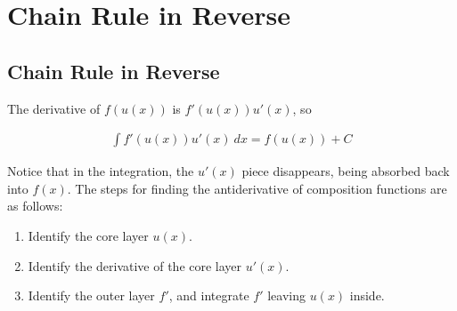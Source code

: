 \chapter{Chain Rule in Reverse}

\section{Chain Rule in Reverse}

The derivative of $ f(u(x)) $ is $ f'(u(x))u'(x) $, so \\

\begin{theorem}
    \begin{align}
        \int f'(u(x))u'(x) \ dx = f(u(x)) + C
    \end{align}
\end{theorem}

Notice that in the integration, the $ u'(x) $ piece disappears, being absorbed back into $ f(x) $. The steps for finding the antiderivative of composition functions are as follows: \\

\begin{enumerate}
    \item
          Identify the core layer $ u(x) $. \\

    \item
          Identify the derivative of the core layer $ u'(x) $. \\

    \item
          Identify the outer layer $ f' $, and integrate $ f' $ leaving $ u(x) $ inside. \\
\end{enumerate}

